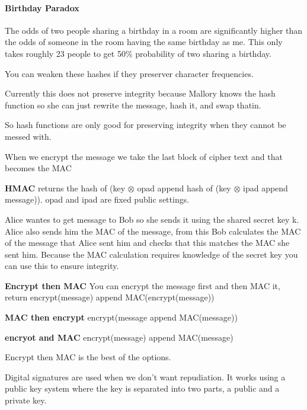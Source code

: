 \documentclass{article}
\begin{document}
\paragraph{Birthday Paradox} %
\label{par:birthday_paradox}
The odds of two people sharing a birthday in a room are significantly higher than the odds of someone in the room having the same birthday as me. This only takes roughly 23 people to get 50\% probability of two sharing a birthday.

You can weaken these hashes if they preserver character frequencies. 


Currently this does not preserve integrity because Mallory knows the hash function so she can just rewrite the message, hash it, and swap thatin.



So hash functions are only good for preserving integrity when they cannot be messed with. 


When we encrypt the message we take the last block of cipher text and that becomes the MAC

\textbf{HMAC} returns the hash of (key $\otimes$ opad append hash of (key $\otimes$ ipad append message)). opad and ipad are fixed public settings.


Alice wantes to get message to Bob so she sends it using the shared secret key k. Alice also sends him the MAC of the message, from this Bob calculates the MAC of the message that Alice sent him and checks that this matches the MAC she sent him. Because the MAC calculation requires knowledge of the secret key you can use this to ensure integrity.


\textbf{Encrypt then MAC} You can encrypt the message first and then MAC it, return encrypt(message) append MAC(encrypt(message))

\textbf{MAC then encrypt} encrypt(message append MAC(message))

\textbf{encryot and MAC} encrypt(message) append MAC(message)

Encrypt then MAC is the best of the options.




Digital signatures are used when we don't want repudiation. It works using a public key system where the key is separated into two parts, a public and a private key.
\end{document}
